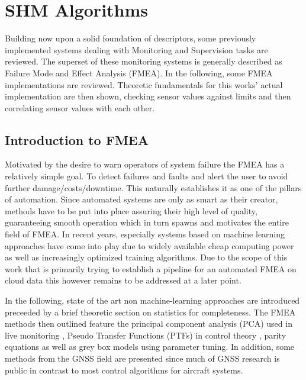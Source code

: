 

\section{SHM Algorithms}

Building now upon a solid foundation of descriptors, some previously implemented systems dealing with Monitoring and Supervision tasks are reviewed. The superset of these monitoring systems is generally described as Failure Mode and Effect Analysis (FMEA). In the following, some FMEA implementations are reviewed. Theoretic fundamentals for this works' actual implementation are then shown, checking sensor values against limits and then correlating sensor values with each other.

\subsection{Introduction to FMEA}

Motivated by the desire to warn operators of system failure the FMEA has a relatively simple goal. To detect failures and faults and alert the user to avoid further damage/costs/downtime. This naturally establishes it as one of the pillars of automation. \cite{isermann_fault-diagnosis_2006} Since automated systems are only as smart as their creator, methods have to be put into place assuring their high level of quality, guaranteeing smooth operation which in turn spawns and motivates the entire field of FMEA. In recent years, especially systems based on machine learning approaches have come into play due to widely available cheap computing power as well as increasingly optimized training algorithms. Due to the scope of this work that is primarily trying to establish a pipeline for an automated FMEA on cloud data this however remains to be addressed at a later point.


In the following, state of the art non machine-learning approaches are introduced preceeded by a brief theoretic section on statistics for completeness. The FMEA methods then outlined feature the principal component analysis (PCA) used in live monitoring \cite{xiao_diagnostic_2006}, Pseudo Transfer Functions (PTFs) in control theory \cite{aljanaideh_aircraft_2015}, parity equations as well as grey box models using parameter tuning. \cite{isermann_fault-diagnosis_2006} In addition, some methods from the GNSS field are presented since much of GNSS research is public in contrast to most control algorithms for aircraft systems.

